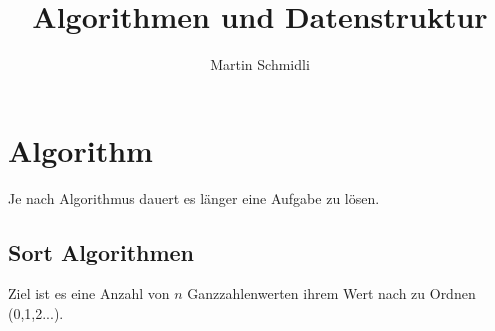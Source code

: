 \documentclass[a4paper,10pt]{report}
\begin{document}
\pagestyle{empty} %

\title{Algorithmen und Datenstruktur}
\author{Martin Schmidli}
\maketitle


\tableofcontents %
\cleardoublepage %

\pagestyle{plain} %



\chapter{Algorithm}
Je nach Algorithmus dauert es länger eine Aufgabe zu lösen.
\section{Sort Algorithmen}
Ziel ist es eine Anzahl von $n$ Ganzzahlenwerten ihrem Wert nach zu Ordnen (0,1,2...).
\end{document}
